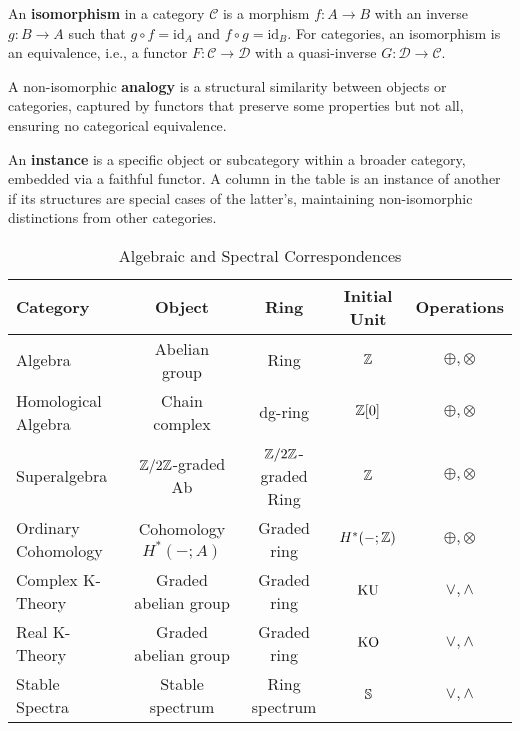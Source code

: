\documentclass{article}
\begin{document}
\begin{definition}[Isomorphism]
An \textbf{isomorphism} in a category \(\mathcal{C}\) is
a morphism \(f: A \to B\) with an inverse \(g: B \to A\)
such that \(g \circ f = \text{id}_A\) and \(f \circ g = \text{id}_B\).
For categories, an isomorphism is an equivalence, i.e.,
a functor \(F: \mathcal{C} \to \mathcal{D}\) with a quasi-inverse \(G: \mathcal{D} \to \mathcal{C}\).
\end{definition}

\begin{definition}[Analogy]
A non-isomorphic \textbf{analogy} is a structural similarity between objects or
categories, captured by functors that preserve some properties but not all,
ensuring no categorical equivalence.
\end{definition}

\begin{definition}[Instance]
An \textbf{instance} is a specific object or subcategory within a broader category,
embedded via a faithful functor. A column in the table is an instance of another
if its structures are special cases of the latter’s, maintaining non-isomorphic
distinctions from other categories.
\end{definition}

\begin{table}[h]
\centering
\caption{Algebraic and Spectral Correspondences}
\begin{tabular}{l|c|c|c|c}
\toprule
Category & Object & Ring & Initial Unit & Operations \\
\midrule
Algebra & Abelian group & Ring & \( \mathbb{Z} \) & \( \oplus, \otimes \) \\
Homological Algebra & Chain complex & dg-ring & \( \mathbb{Z}[0] \) & \( \oplus, \otimes \) \\
Superalgebra & \( \mathbb{Z}/2\mathbb{Z} \)-graded Ab & \( \mathbb{Z}/2\mathbb{Z} \)-graded Ring & \( \mathbb{Z} \) & \( \oplus, \otimes \) \\
Ordinary Cohomology & Cohomology \( H^*(-; A) \) & Graded ring & \( H^*(-; \mathbb{Z}) \) & \( \oplus, \otimes \) \\
Complex K-Theory & Graded abelian group & Graded ring & \( \text{KU} \) & \( \vee, \wedge \) \\
Real K-Theory & Graded abelian group & Graded ring & \( \text{KO} \) & \( \vee, \wedge \) \\
Stable Spectra & Stable spectrum & Ring spectrum & \( \mathbb{S} \) & \( \vee, \wedge \) \\
\bottomrule
\end{tabular}
\end{table}
\end{document}
